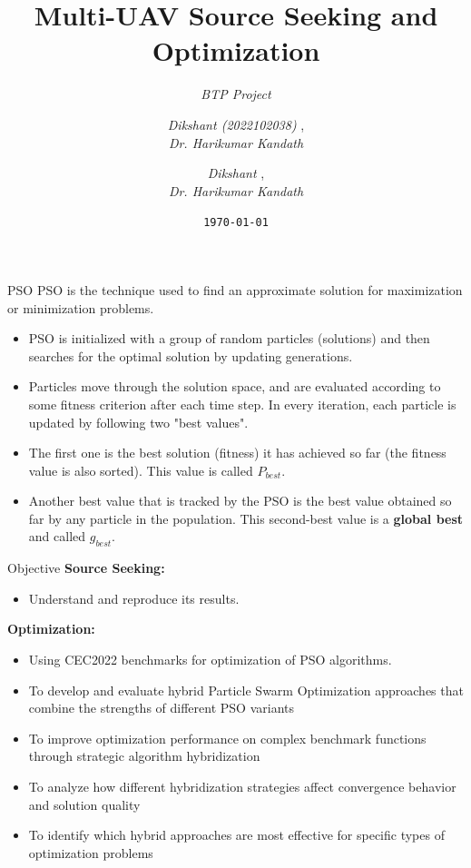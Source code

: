 \documentclass[aspectratio=169]{beamer}
\title{\textbf{Multi-UAV Source Seeking and Optimization}}
\subtitle{\textit{BTP Project}}
\author{
    \textit{Dikshant (2022102038) }, \\
    \textit{Dr. Harikumar Kandath}
}
\date{\texttt{\today}}
\begin{document}
\begin{frame}
\titlepage 
\end{frame}
\author{
    \textit{Dikshant }, \\
    \textit{Dr. Harikumar Kandath}
}

\begin{frame}{PSO}
    PSO is the technique used to find an approximate solution for maximization or minimization problems.
    \begin{itemize}
        \item PSO is initialized with a group of random particles (solutions) and then searches for the optimal solution by updating generations.
        \item Particles move through the solution space, and are evaluated according to some fitness criterion after each time step. In every iteration, each particle is updated by following two "best values".
        \item The first one is the best solution (fitness) it has achieved so far (the fitness value is also sorted). This value is called \textbf{$P_{best}$}.
        \item Another best value that is tracked by the PSO is the best value obtained so far by any particle in the population. This second-best value is a \textbf{global best} and called \textbf{$g_{best}$}.
    \end{itemize}
\end{frame}

\begin{frame}{Objective}
\textbf{Source Seeking:}
    \begin{itemize}
        \item Understand \cite{10312321} and reproduce its results.
    \end{itemize}

\textbf{Optimization:}
    \begin{itemize}
        \item Using CEC2022 benchmarks \cite{luo2022benchmarkfunctionscec2022} for optimization of \cite{10312321} PSO algorithms.
        \item To develop and evaluate hybrid Particle Swarm Optimization approaches that combine the strengths of different PSO variants
        \item To improve optimization performance on complex benchmark functions through strategic algorithm hybridization
        \item To analyze how different hybridization strategies affect convergence behavior and solution quality
        \item To identify which hybrid approaches are most effective for specific types of optimization problems
    \end{itemize}
    
\end{frame}
\end{document}
